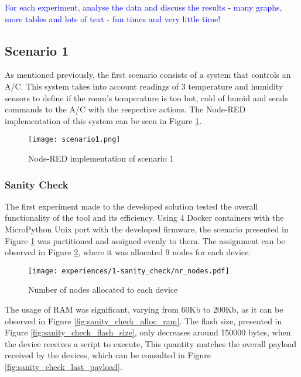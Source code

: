 \textcolor{blue}{For each experiment, analyse the data and discuss the results - many graphs, more tables and lots of text - fun times and very little time!}

\subsection{Scenario 1}\label{sec:discussion_scenario1}

As mentioned previously, the first scenario consists of a system that controls an A/C. This system takes into account readings of 3 temperature and humidity sensors to define if the room's temperature is too hot, cold of humid and sends commands to the A/C with the respective actions. The Node-RED implementation of this system can be seen in Figure \ref{fig:scenario1_node_red}.

\begin{figure}[h]
\centering
\texttt{[image: scenario1.png]}
\caption[Node-RED implementation of scenario 1]{Node-RED implementation of scenario 1}\label{fig:scenario1_node_red}
\end{figure}


\subsubsection{Sanity Check}

The first experiment made to the developed solution tested the overall functionality of the tool and its efficiency. Using 4 Docker containers with the MicroPython Unix port with the developed firmware, the scenario presented in Figure \ref{fig:scenario1_node_red} was partitioned and assigned evenly to them. The assignment can be observed in Figure \ref{fig:sanity_check_nr_nodes}, where it was allocated 9 nodes for each device.

\begin{figure}[h]
\centering
\texttt{[image: experiences/1-sanity\_check/nr\_nodes.pdf]}
\caption[Number of nodes allocated to each device]{Number of nodes allocated to each device}\label{fig:sanity_check_nr_nodes}
\end{figure}

The usage of RAM was significant, varying from 60Kb to 200Kb, as it can be observed in Figure \ref{fig:sanity_check_alloc_ram}. The flash size, presented in Figure \ref{fig:sanity_check_flash_size}, only decreases around 150000 bytes, when the device receives a script to execute, This quantity matches the overall payload received by the devices, which can be consulted in Figure \ref{fig:sanity_check_last_payload}.

